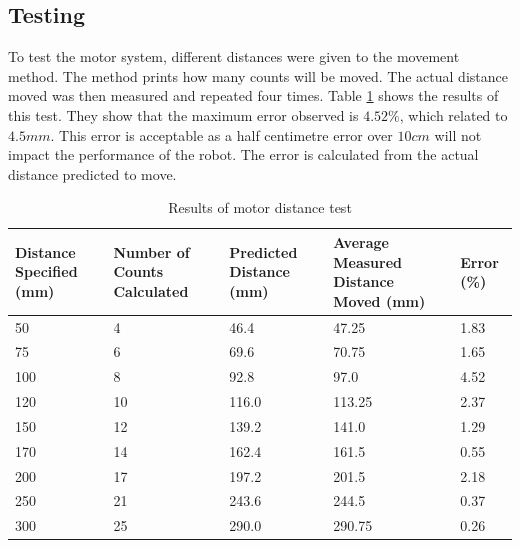 \subsection{Testing}\label{Section:MotorTest}

To test the motor system, different distances were given to the movement method. The method prints how many counts will be moved. The actual distance moved was then measured and repeated four times. Table \ref{table:results:motor:distance} shows the results of this test. They show that the maximum error observed is $4.52\%$, which related to $4.5mm$. This error is acceptable as a half centimetre error over $10cm$ will not impact the performance of the robot. The error is calculated from the actual distance predicted to move. 


\begin{table}
\caption{Results of motor distance test}
\label{table:results:motor:distance}
\begin{tabular}{p{2.5cm}p{2.5cm}p{2.5cm}p{2.5cm}p{2.5cm}} \toprule
\textbf{Distance Specified (mm)} &	\textbf{Number of Counts Calculated}	& \textbf{Predicted Distance (mm)}	& 	\textbf{Average Measured Distance Moved (mm)}	&	\textbf{Error (\%)} \\ \toprule
50						&	4							&	46.4							&	47.25									&	1.83		\\ \midrule
75						&	6							&	69.6							&	70.75									&	1.65		\\ \midrule
100						&	8							&	92.8							&	97.0									&	4.52		\\ \midrule
120						&	10							&	116.0							&	113.25									&	2.37		\\ \midrule
150						&	12							&	139.2							&	141.0									&	1.29		\\ \midrule
170						&	14							&	162.4							&	161.5									&	0.55		\\ \midrule
200						&	17							&	197.2							&	201.5									&	2.18		\\ \midrule
250						&	21							&	243.6							&	244.5									&	0.37		\\ \midrule
300						&	25							&	290.0							&	290.75									&	0.26		\\ \bottomrule
\end{tabular}
\end{table}


